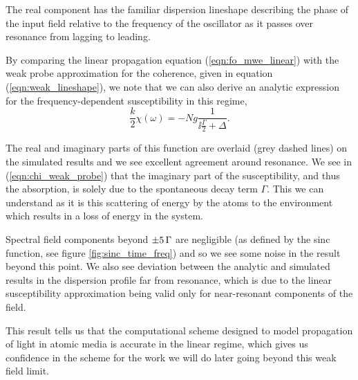     The real component has the familiar dispersion lineshape describing the
    phase of the input field relative to the frequency of the oscillator as it
    passes over resonance from lagging to leading\cite{hecht2015optics}.

    By comparing the linear propagation equation (\ref{eqn:fo_mwe_linear})
    with the weak probe approximation for the coherence, given in equation
    (\ref{eqn:weak_lineshape}), we note that we can also derive an analytic
    expression for the frequency-dependent susceptibility in this regime,
    \begin{equation}\label{eqn:chi_weak_probe}
        \frac{k}{2} \chi(\omega) = -Ng \frac{1}{\ii \frac{\Gamma}{2} + \Delta}.
    \end{equation}

    The real and imaginary parts of this function are overlaid (grey dashed
    lines) on the simulated results and we see excellent agreement around
    resonance. We see in (\ref{eqn:chi_weak_probe}) that the imaginary part of
    the susceptibility, and thus the absorption, is solely due to the
    spontaneous decay term $\Gamma$. This we can understand as it is this
    scattering of energy by the atoms to the environment which results in a loss
    of energy in the system.

    Spectral field components beyond $\unit[\pm 5]{\Gamma}$ are negligible (as
    defined by the sinc function, see figure \ref{fig:sinc_time_freq}) and so we
    see some noise in the result beyond this point. We also see deviation
    between the analytic and simulated results in the dispersion profile far
    from resonance, which is due to the linear susceptibility approximation
    being valid only for near-resonant components of the field.

    This result tells us that the computational scheme designed to
    model propagation of light in atomic media is accurate in the linear regime,
    which gives us confidence in the scheme for the work we will do later going beyond this weak field limit.

